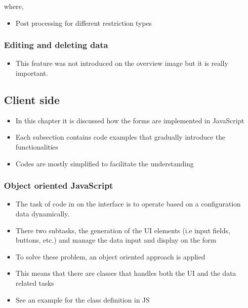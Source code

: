 
where,



\begin{itemize}
	\item Post processing for different restriction types
\end{itemize}



\subsubsection{Editing and deleting data}

\begin{itemize}
	\item This feature was not introduced on the overview image but it is really important.
\end{itemize}




\subsection{Client side}

\begin{itemize}
	\item In this chapter it is discussed how the forms are implemented in JavaScript
	\item Each subsection contains code examples that gradually introduce the functionalities
	\item Codes are mostly simplified to facilitate the understanding		
\end{itemize}


\subsubsection{Object oriented JavaScript}

\begin{itemize}
	\item The task of code in on the interface is to operate based on a configuration data dynamically.
	\item There two subtasks, the generation of the UI elements (i.e input fields, buttons, etc.) and manage the data input and display on the form
	\item To solve these problem, an object oriented approach is applied
	\item This means that there are classes that handles both the UI and the data related tasks
	\item See an example for the class definition in JS
\end{itemize}


